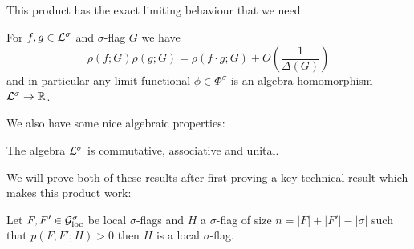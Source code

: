 This product has the exact limiting behaviour that we need:

\begin{theorem}
    \label{thm:local_product_lim}
    For $f, g \in \mathcal{L}^\sigma$ and $\sigma$-flag $G$ we have
    \[\rho(f; G)\rho(g; G) = \rho(f\cdot g; G) + O\left(\frac{1}{\Delta(G)}\right)\]
    and in particular any limit functional $\phi\in\Phi^\sigma$ is an algebra
    homomorphism $\mathcal{L}^\sigma \to \mathbb{R}$.
\end{theorem}

We also have some nice algebraic properties:

\begin{lemma}
    \label{lemma:local_assoc}
    The algebra $\mathcal{L}^\sigma$ is commutative, associative and unital.
\end{lemma}

We will prove both of these results after first proving a key technical result which makes this
product work:

\begin{theorem}
    Let $F, F' \in \mathcal{G}_\mathrm{loc}^\sigma$ be local $\sigma$-flags and $H$ a $\sigma$-flag
    of size $n=|F|+|F'|-|\sigma|$ such that $p(F, F'; H) > 0$ then $H$ is a local
    $\sigma$-flag.
\end{theorem}

